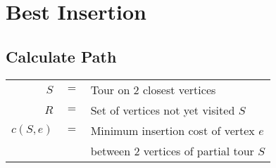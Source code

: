 \documentclass[
	final,
	a4paper,
	oneside,
	parskip=full,
	headings=standardclasses,
	headings=big,
	pointednumbers
]{scrartcl}
\newcommand{\kl}[1]{{\left( #1 \right)}}
\begin{document}

    \begin{minipage}[t]{.5\linewidth}
        \section*{Best Insertion}

        \subsection*{Calculate Path}
    \end{minipage}
    \begin{minipage}[t]{.5\linewidth}
            \begin{tabular}[t]{@{} r @{\hskip 1mm} c @{\hskip 1mm} l @{}}
                         $S$ & $=$ & Tour on 2 closest vertices \\
                         $R$ & $=$ & Set of vertices not yet visited $S$ \\
                $c\kl{S, e}$ & $=$ & Minimum insertion cost of vertex $e$ \\
                             &     & between 2 vertices of partial tour $S$
            \end{tabular}
    \end{minipage}
\end{document}
